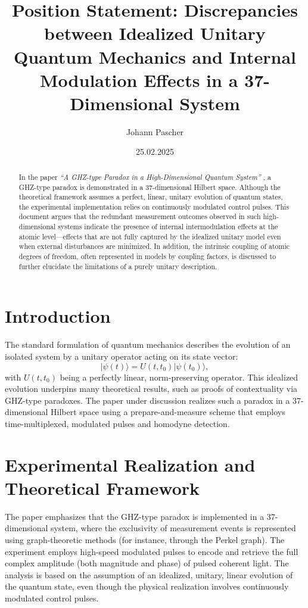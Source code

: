 \documentclass[12pt]{article}
\title{Position Statement: Discrepancies between Idealized Unitary Quantum Mechanics and Internal Modulation Effects in a 37-Dimensional System}
\author{Johann Pascher}
\date{25.02.2025}
\begin{document}
	\maketitle
	
	\begin{abstract}
		In the paper \emph{``A GHZ-type Paradox in a High-Dimensional Quantum System''} \cite{ScienceAdvances}, a GHZ-type paradox is demonstrated in a 37-dimensional Hilbert space. Although the theoretical framework assumes a perfect, linear, unitary evolution of quantum states, the experimental implementation relies on continuously modulated control pulses. This document argues that the redundant measurement outcomes observed in such high-dimensional systems indicate the presence of internal intermodulation effects at the atomic level—effects that are not fully captured by the idealized unitary model even when external disturbances are minimized. In addition, the intrinsic coupling of atomic degrees of freedom, often represented in models by coupling factors, is discussed to further elucidate the limitations of a purely unitary description.
	\end{abstract}
	
	\section{Introduction}
	The standard formulation of quantum mechanics describes the evolution of an isolated system by a unitary operator acting on its state vector:
	\[
	|\psi(t)\rangle = U(t,t_0)|\psi(t_0)\rangle,
	\]
	with \(U(t,t_0)\) being a perfectly linear, norm-preserving operator. This idealized evolution underpins many theoretical results, such as proofs of contextuality via GHZ-type paradoxes. The paper under discussion realizes such a paradox in a 37-dimensional Hilbert space using a prepare-and-measure scheme that employs time-multiplexed, modulated pulses and homodyne detection.
	
	\section{Experimental Realization and Theoretical Framework}
	The paper emphasizes that the GHZ-type paradox is implemented in a 37-dimensional system, where the exclusivity of measurement events is represented using graph-theoretic methods (for instance, through the Perkel graph). The experiment employs high-speed modulated pulses to encode and retrieve the full complex amplitude (both magnitude and phase) of pulsed coherent light. The analysis is based on the assumption of an idealized, unitary, linear evolution of the quantum state, even though the physical realization involves continuously modulated control pulses.
	
\end{document}
